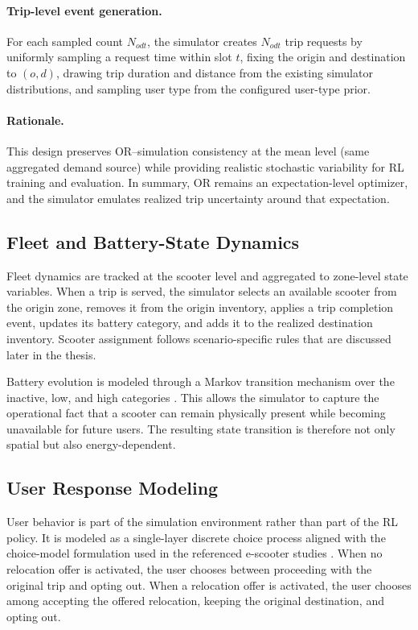 \paragraph{Trip-level event generation.}
For each sampled count $N_{odt}$, the simulator creates $N_{odt}$ trip requests by uniformly sampling a request time within slot $t$, fixing the origin and destination to $(o,d)$, drawing trip duration and distance from the existing simulator distributions, and sampling user type from the configured user-type prior.

\paragraph{Rationale.}
This design preserves OR--simulation consistency at the mean level (same aggregated demand source) while providing realistic stochastic variability for RL training and evaluation.  
In summary, OR remains an expectation-level optimizer, and the simulator emulates realized trip uncertainty around that expectation.


\subsection{Fleet and Battery-State Dynamics}

Fleet dynamics are tracked at the scooter level and aggregated to zone-level state variables. When a trip is served, the simulator selects an available scooter from the origin zone, removes it from the origin inventory, applies a trip completion event, updates its battery category, and adds it to the realized destination inventory. Scooter assignment follows scenario-specific rules that are discussed later in the thesis.

Battery evolution is modeled through a Markov transition mechanism over the inactive, low, and high categories \parencite{momen2025}. This allows the simulator to capture the operational fact that a scooter can remain physically present while becoming unavailable for future users. The resulting state transition is therefore not only spatial but also energy-dependent.

\subsection{User Response Modeling}

User behavior is part of the simulation environment rather than part of the RL policy. It is modeled as a single-layer discrete choice process aligned with the choice-model formulation used in the referenced e-scooter studies \parencite{burghardt2025behavioral,momen2025}. When no relocation offer is activated, the user chooses between proceeding with the original trip and opting out. When a relocation offer is activated, the user chooses among accepting the offered relocation, keeping the original destination, and opting out.

